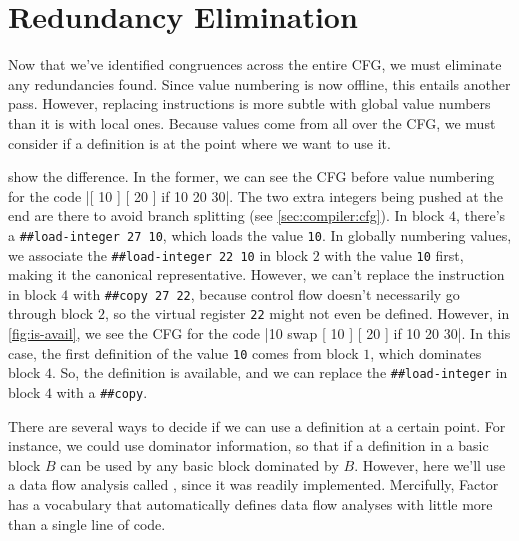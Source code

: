 \section{Redundancy Elimination}\label{sec:vn:avail}

Now that we've identified congruences across the entire \gls{CFG}, we must
eliminate any redundancies found.  Since value numbering is now offline, this
entails another pass.  However, replacing instructions is more subtle with
global value numbers than it is with local ones.  Because values come from all
over the \gls{CFG}, we must consider if a definition is  at the
point where we want to use it.  


 show the difference.  In the former, we can
see the \gls{CFG} before value numbering for the code
%
\factor|[ 10 ] [ 20 ] if 10 20 30|.
%
The two extra integers being pushed at the end are there to avoid branch
splitting (see \vref{sec:compiler:cfg}).  In block $4$, there's a
%
\Verb|##load-integer 27 10|,
%
which loads the value \Verb|10|.  In globally numbering values, we associate
the
%
\Verb|##load-integer 22 10|
%
in block $2$ with the value \Verb|10| first, making it the canonical
representative.  However, we can't replace the instruction in block $4$ with
%
\Verb|##copy 27 22|,
%
because control flow doesn't necessarily go through block $2$, so the virtual
register \Verb|22| might not even be defined.  However, in
\vref{fig:is-avail}, we see the \gls{CFG} for the code
%
\factor|10 swap [ 10 ] [ 20 ] if 10 20 30|.
%
In this case, the first definition of the value \Verb|10| comes from block
$1$, which dominates block $4$.  So, the definition is available, and we can
replace the \Verb|##load-integer| in block $4$ with a \Verb|##copy|.

There are several ways to decide if we can use a definition at a certain point.
For instance, we could use dominator information, so that if a definition in a
basic block $B$ can be used by any basic block dominated by $B$.  However, here we'll use a data flow analysis called , since it was readily implemented.  Mercifully, Factor has
a vocabulary that automatically defines data flow analyses with little more
than a single line of code.


